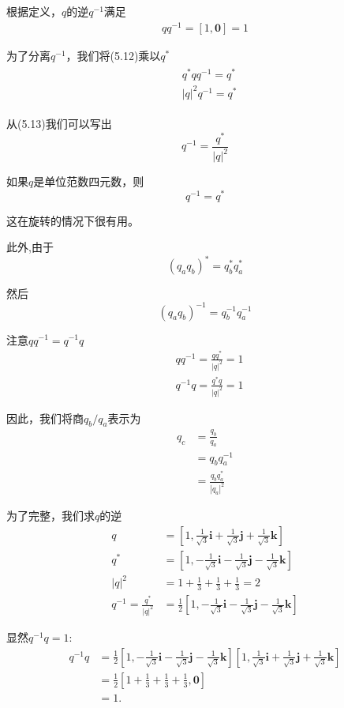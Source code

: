 根据定义，$q$的逆$q^{-1}$满足
\begin{align}
    q q^{-1}=[1, \mathbf{0}]=1
\end{align}

为了分离$q^{-1}$，我们将(5.12)乘以$q^{*}$
\begin{align}
    \begin{aligned}
        & q^{*} q q^{-1}=q^{*} \\
        & |q|^{2} q^{-1}=q^{*}
    \end{aligned}
\end{align}

从(5.13)我们可以写出
$$
q^{-1}=\frac{q^{*}}{|q|^{2}}
$$

如果$q$是单位范数四元数，则
$$
q^{-1}=q^{*}
$$

这在旋转的情况下很有用。

此外,由于
$$
\left(q_{a} q_{b}\right)^{*}=q_{b}^{*} q_{a}^{*}
$$

然后
$$
\left(q_{a} q_{b}\right)^{-1}=q_{b}^{-1} q_{a}^{-1}
$$

注意$q q^{-1}=q^{-1} q$
$$
\begin{aligned}
& q q^{-1}=\frac{q q^{*}}{|q|^{2}}=1 \\
& q^{-1} q=\frac{q^{*} q}{|q|^{2}}=1
\end{aligned}
$$

因此，我们将商$q_{b} / q_{a}$表示为
$$
\begin{aligned}
q_{c} & =\frac{q_{b}}{q_{a}} \\
& =q_{b} q_{a}^{-1} \\
& =\frac{q_{b} q_{a}^{*}}{\left|q_{a}\right|^{2}}
\end{aligned}
$$

为了完整，我们求$q$的逆
$$
\begin{aligned}
q & =\left[1, \frac{1}{\sqrt{3}} \mathbf{i}+\frac{1}{\sqrt{3}} \mathbf{j}+\frac{1}{\sqrt{3}} \mathbf{k}\right] \\
q^{*} & =\left[1,-\frac{1}{\sqrt{3}} \mathbf{i}-\frac{1}{\sqrt{3}} \mathbf{j}-\frac{1}{\sqrt{3}} \mathbf{k}\right] \\
|q|^{2} & =1+\frac{1}{3}+\frac{1}{3}+\frac{1}{3}=2 \\
q^{-1}=\frac{q^{*}}{|q|^{2}} & =\frac{1}{2}\left[1,-\frac{1}{\sqrt{3}} \mathbf{i}-\frac{1}{\sqrt{3}} \mathbf{j}-\frac{1}{\sqrt{3}} \mathbf{k}\right]
\end{aligned}
$$

显然$q^{-1} q=1$:
$$
\begin{aligned}
q^{-1} q & =\frac{1}{2}\left[1,-\frac{1}{\sqrt{3}} \mathbf{i}-\frac{1}{\sqrt{3}} \mathbf{j}-\frac{1}{\sqrt{3}} \mathbf{k}\right]\left[1, \frac{1}{\sqrt{3}} \mathbf{i}+\frac{1}{\sqrt{3}} \mathbf{j}+\frac{1}{\sqrt{3}} \mathbf{k}\right] \\
& =\frac{1}{2}\left[1+\frac{1}{3}+\frac{1}{3}+\frac{1}{3}, \mathbf{0}\right] \\
& =1 .
\end{aligned}
$$

